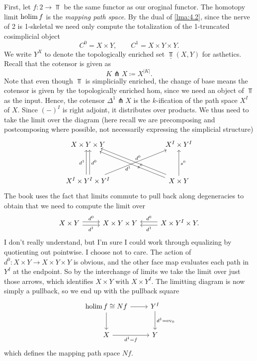 First, let $f : 2 \to \Top $ be the same functor as our oroginal functor. The homotopy limit $\operatorname*{holim} f$ is the \emph{mapping path space}. By the dual of \cref{lma:4.2}, since the nerve of 2 is 1-skeletal we need only compute the totalization of the 1-truncated cosimplicial object
\[
	C^0=X\times Y,\qquad C^1=X\times Y\times Y
.\]
We write $Y^X$ to denote the topologically enriched set $\underline{\Top } (X,Y)$ for asthetics. Recall that the cotensor is given as
\[
	K\pitchfork X \coloneqq X^{\left| K \right| } 
.\]
Note that even though $\Top $ is simplicially enriched, the change of base means the cotensor is given by the topologically enriched hom, since we need an object of $\Top $ as the input. Hence, the cotensor $\Delta^1\pitchfork X$ is the $k$-ification of the path space $X^I$ of $X$. Since $(-)^I$ is right adjoint, it distributes over products. We thus need to take the limit over the diagram (here recall we are precomposing and postcomposing where possible, not necessarily expressing the simplicial structure)
\[\begin{tikzcd}
	{X\times Y\times Y} &&& {X^I\times Y^I} \\
	\\
	{X^I\times Y^I\times Y^I} &&& {X\times Y}
	\arrow["{d^1}", shift left, from=3-1, to=1-1]
	\arrow["{d^0}"', shift right, from=3-1, to=1-1]
	\arrow["{s^0}"', from=3-1, to=1-4]
	\arrow["{d^1}", shift left, from=3-4, to=1-1]
	\arrow["{d^0}"', shift right, from=3-4, to=1-1]
	\arrow["{s^0}"', from=3-4, to=1-4]
\end{tikzcd}\]
The book uses the fact that limits commute to pull back along degeneracies to obtain that we need to compute the limit over
\[\begin{tikzcd}[row sep = 2.5em, column sep = 2.5em]
	X\times Y\ar[" d^0 ", shift left, r] \ar[" d^1 "', shift right, r]  & X\times Y\times Y & X\times Y^I\times Y\ar[" d^1 ", shift left, l] \ar[" d^0 "', shift right, l] .
\end{tikzcd}\]
I don't really understand, but I'm sure I could work through equalizing by quotienting out pointwise. I choose not to care. The action of $d^0: X\times Y \to X\times Y\times Y$ is obvious, and the other face map evaluates each path in $Y^I$ at the endpoint. So by the interchange of limits we take the limit over just those arrows, which identifies $X\times Y$ with $X\times Y^I$. The limitting diagram is now simply a pullback, so we end up with the pullback square
\[\begin{tikzcd}[row sep = 2.5em, column sep = 2.5em]
\holim f\cong Nf\ar[r] \ar[d]  & Y^I \ar[" d^1=\mathrm{ev}_0 ", d]  \\
X\ar[" d^1=f "', r]  & Y
\end{tikzcd}\]
which defines the mapping path space $Nf$.


